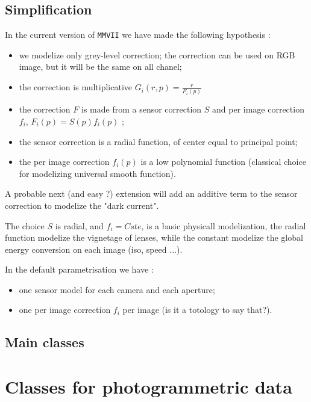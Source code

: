 \subsection{Simplification}

In the current version of {\tt MMVII} we have made the following hypothesis :

\begin{itemize}
        \item  we modelize only grey-level correction;  the correction can be used on
		RGB image, but it will be the same on all chanel;
	\item  the correction is multiplicative   $G_i(r,p) = \frac{r}{F_i(p)} $
        \item  the correction $F$ is made from a sensor correction $S$ and per image correction $f_i$,
		$F_i(p) = S(p) f_i(p)$ ;
        \item  the sensor correction is a radial function, of center equal to principal point;
	\item  the per image correction $f_i(p)$ is a low polynomial function (classical choice
		for modelizing universal smooth function).
\end{itemize}

A probable next (and easy ?)  extension will add an additive term to the sensor 
correction to modelize the "dark current".

The choice $S$ is radial, and $f_i=Cste$, is a basic physicall modelization, the radial
function modelize the vignetage of lenses, while the constant modelize the global
energy conversion on each image (iso, speed ...).

In the default parametrisation we have :

\begin{itemize}
        \item one sensor model for each camera and each aperture;
	\item one per image correction $f_i$ per image (is it a totology to say that?).
\end{itemize}

\subsection{Main classes}


\section{Classes for photogrammetric data}

